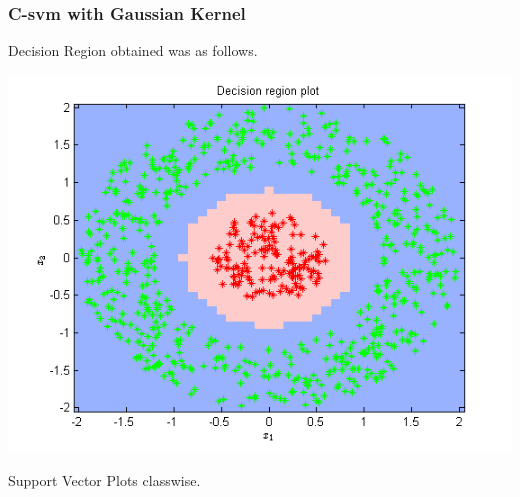 \documentclass{article}
\begin{document}
\subsubsection{C-svm with Gaussian Kernel}
Decision Region obtained was as follows.
\begin{center}
\includegraphics[scale=1]{Classification/1b/c_g/dec}
\end{center}
Support Vector Plots classwise.
\end{document}
